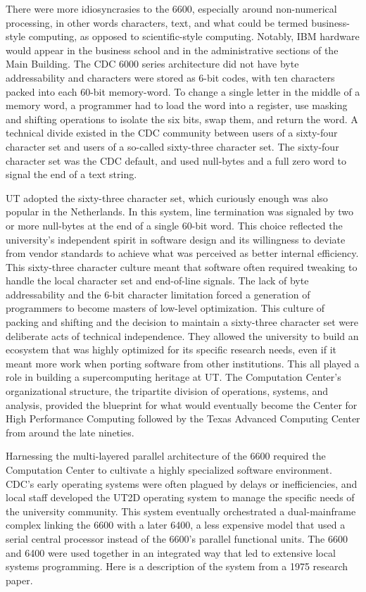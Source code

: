 There were more idiosyncrasies to the 6600, especially around non-numerical processing, in other words characters, text, and what could be termed business-style computing, as opposed to scientific-style computing. Notably, IBM hardware would appear in the business school and in the administrative sections of the Main Building. The CDC 6000 series architecture did not have byte addressability and characters were stored as 6-bit codes, with ten characters packed into each 60-bit memory-word. To change a single letter in the middle of a memory word, a programmer had to load the word into a register, use masking and shifting operations to isolate the six bits, swap them, and return the word. A technical divide existed in the CDC community between users of a sixty-four character set and users of a so-called sixty-three character set. The sixty-four character set was the CDC default, and used null-bytes and a full zero word to signal the end of a text string. 

UT adopted the sixty-three character set, which curiously enough was also popular in the Netherlands. In this system, line termination was signaled by two or more null-bytes at the end of a single 60-bit word. This choice reflected the university's independent spirit in software design and its willingness to deviate from vendor standards to achieve what was perceived as better internal efficiency. This sixty-three character culture meant that software often required tweaking to handle the local character set and end-of-line signals. The lack of byte addressability and the 6-bit character limitation forced a generation of programmers to become masters of low-level optimization. This culture of packing and shifting and the decision to maintain a sixty-three character set were deliberate acts of technical independence. They allowed the university to build an ecosystem that was highly optimized for its specific research needs, even if it meant more work when porting software from other institutions. This all played a role in building a supercomputing heritage at UT. The Computation Center's organizational structure, the tripartite division of operations, systems, and analysis, provided the blueprint for what would eventually become the Center for High Performance Computing followed by the Texas Advanced Computing Center from around the late nineties.

Harnessing the multi-layered parallel architecture of the 6600 required the Computation Center to cultivate a highly specialized software environment. CDC’s early operating systems were often plagued by delays or inefficiencies, and local staff developed the UT2D operating system to manage the specific needs of the university community. This system eventually orchestrated a dual-mainframe complex linking the 6600 with a later 6400, a less expensive model that used a serial central processor instead of the 6600's parallel functional units. The 6600 and 6400 were used together in an integrated way that led to extensive local systems programming. Here is a description of the system from a 1975 research paper.

